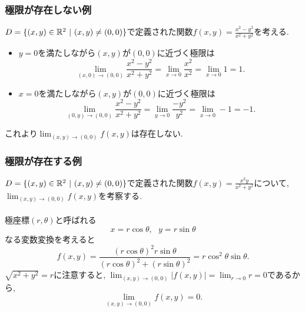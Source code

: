 

\begin{frame}
\frametitle{極限が存在しない例}

$D=\{(x,y) \in \mathbb{R}^2 \ | \ (x,y) \ne (0,0)\}$で定義された関数$f(x,y)=\frac{x^2-y^2}{x^2+y^2}$を考える. 

\begin{itemize}
\item $y=0$を満たしながら$(x,y)$が$(0,0)$に近づく極限は
$$
\lim_{(x,0)\to (0,0)} \frac{x^2-y^2}{x^2+y^2} 
=\lim_{x\to 0} \frac{x^2}{x^2}  =\lim_{x\to 0} 1=1. 
$$
\item $x=0$を満たしながら$(x,y)$が$(0,0)$に近づく極限は
$$
\lim_{(0,y)\to (0,0)} \frac{x^2-y^2}{x^2+y^2} 
=\lim_{y\to 0} \frac{-y^2}{y^2}  =\lim_{x\to 0} -1=-1. 
$$
\end{itemize}
これより$\displaystyle \lim_{(x,y)\to (0,0)}f(x,y)$は存在しない. 
\end{frame}





\begin{frame}
\frametitle{極限が存在する例}

$D=\{(x,y) \in \mathbb{R}^2 \ | \ (x,y) \ne (0,0)\}$で定義された関数$f(x,y)=\frac{x^2y}{x^2+y^2}$について, $\displaystyle \lim_{(x,y)\to (0,0)}f(x,y)$を考察する. \\
\ \\

極座標$(r,\theta)$と呼ばれる
$$
x= r \cos \theta, \ \ \ y = r \sin \theta
$$
なる変数変換を考えると
$$
f(x,y)=\frac{(r\cos \theta)^2 r \sin \theta}{(r \cos \theta)^2+(r \sin \theta)^2}=r \cos^2 \theta \sin \theta. 
$$
$\sqrt{x^2+y^2}=r$に注意すると, $\displaystyle \lim_{(x,y)\to (0,0)}|f(x,y)|= \lim_{r \to 0} r=0$であるから, 
$$
\lim_{(x,y)\to (0,0)}f(x,y)=0.
$$
 
\end{frame}




